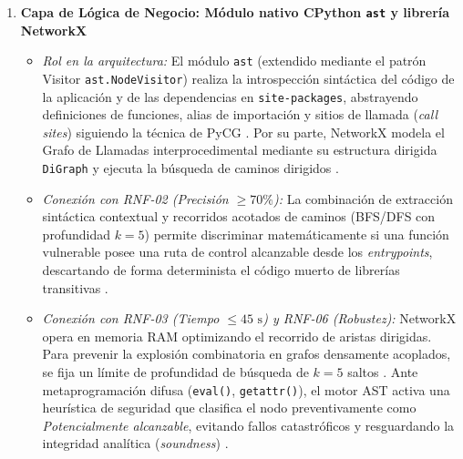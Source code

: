 \begin{enumerate}
    \item \textbf{Capa de Lógica de Negocio: Módulo nativo CPython \texttt{ast} y librería NetworkX}
    \begin{itemize}
        \item \textit{Rol en la arquitectura:} El módulo \texttt{ast} (extendido mediante el patrón Visitor \texttt{ast.\allowbreak NodeVisitor}) realiza la introspección sintáctica del código de la aplicación y de las dependencias en \texttt{site-\allowbreak packages}, abstrayendo definiciones de funciones, alias de importación y sitios de llamada (\textit{call sites}) siguiendo la técnica de PyCG \cite{salis2021pycg}. Por su parte, NetworkX modela el Grafo de Llamadas interprocedimental mediante su estructura dirigida \texttt{DiGraph} y ejecuta la búsqueda de caminos dirigidos \cite{hagberg2008exploring, ryder1979constructing}.
        \item \textit{Conexión con RNF-02 (Precisión $\ge 70\%$):} La combinación de extracción sintáctica contextual y recorridos acotados de caminos (BFS/DFS con profundidad $k=5$) permite discriminar matemáticamente si una función vulnerable posee una ruta de control alcanzable desde los \textit{entrypoints}, descartando de forma determinista el código muerto de librerías transitivas \cite{pashchenko2022vuln4real}.
        \item \textit{Conexión con RNF-03 (Tiempo $\le 45\text{ s}$) y RNF-06 (Robustez):} NetworkX opera en memoria RAM optimizando el recorrido de aristas dirigidas. Para prevenir la explosión combinatoria en grafos densamente acoplados, se fija un límite de profundidad de búsqueda de $k=5$ saltos \cite{hagberg2008exploring}. Ante metaprogramación difusa (\texttt{eval()}, \texttt{getattr()}), el motor AST activa una heurística de seguridad que clasifica el nodo preventivamente como \textit{Potencialmente alcanzable}, evitando fallos catastróficos y resguardando la integridad analítica (\textit{soundness}) \cite{nielson1999principles}.
    \end{itemize}


\end{enumerate}
